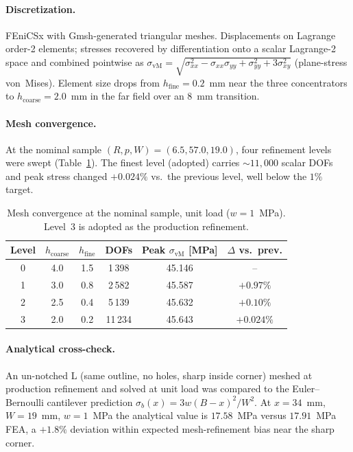 \documentclass{article}
\begin{document}
\paragraph{Discretization.} FEniCSx with Gmsh-generated triangular meshes.
Displacements on Lagrange order-2 elements; stresses recovered by
differentiation onto a scalar Lagrange-2 space and combined pointwise as
$\sigma_{\mathrm{vM}} = \sqrt{\sigma_{xx}^2 - \sigma_{xx}\sigma_{yy} +
\sigma_{yy}^2 + 3\sigma_{xy}^2}$ (plane-stress von~Mises). Element size
drops from $h_{\text{fine}}=0.2$~mm near the three concentrators to
$h_{\text{coarse}}=2.0$~mm in the far field over an 8~mm transition.

\paragraph{Mesh convergence.} At the nominal sample $(R, p, W) = (6.5,
57.0, 19.0)$, four refinement levels were swept (Table~\ref{tab:conv}).
The finest level (adopted) carries $\sim 11{,}000$ scalar DOFs and peak
stress changed $+0.024\%$ vs.\ the previous level, well below the
$1\%$ target.

\begin{table}[h]
  \centering
  \caption{Mesh convergence at the nominal sample, unit load
    ($w=1$~MPa). Level~3 is adopted as the production refinement.}
  \label{tab:conv}
  \begin{tabular}{cccccc}
    \toprule
    Level & $h_{\text{coarse}}$ & $h_{\text{fine}}$ & DOFs &
      Peak $\sigma_{\mathrm{vM}}$ [MPa] & $\Delta$ vs.\ prev. \\
    \midrule
    0 & 4.0 & 1.5 & 1\,398  & 45.146 & -- \\
    1 & 3.0 & 0.8 & 2\,582  & 45.587 & $+0.97\%$ \\
    2 & 2.5 & 0.4 & 5\,139  & 45.632 & $+0.10\%$ \\
    3 & 2.0 & 0.2 & 11\,234 & 45.643 & $+0.024\%$ \\
    \bottomrule
  \end{tabular}
\end{table}

\paragraph{Analytical cross-check.} An un-notched L (same outline, no
holes, sharp inside corner) meshed at production refinement and solved
at unit load was compared to the Euler--Bernoulli cantilever prediction
$\sigma_b(x) = 3w(B-x)^2/W^2$. At $x=34$~mm, $W=19$~mm, $w=1$~MPa the
analytical value is $17.58$~MPa versus $17.91$~MPa FEA, a $+1.8\%$
deviation within expected mesh-refinement bias near the sharp corner.
\end{document}
